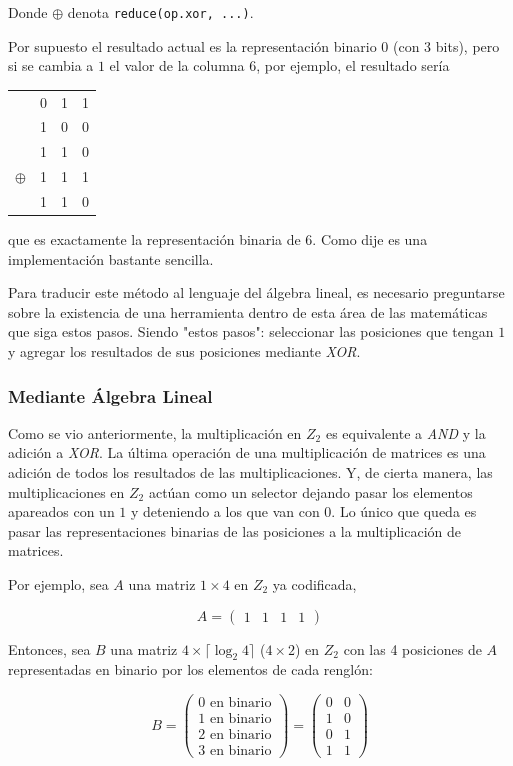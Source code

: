 \documentclass{article}
\begin{document}
Donde $\oplus$ denota \texttt{reduce(op.xor, ...)}.

Por supuesto el resultado actual es la representación binario $0$ (con 3 bits), pero si se cambia a $1$ el valor de la columna 6, por ejemplo, el resultado sería

\begin{center}
\begin{tabular}{c c c c}
    & 0 & 1 & 1 \\
    & 1 & 0 & 0 \\
    & 1 & 1 & 0 \\
    $\oplus$ & 1 & 1 & 1 \\
    \hline
    & 1 & 1 & 0
\end{tabular}
\end{center}
que es exactamente la representación binaria de 6. Como dije es una implementación bastante sencilla.

Para traducir este método al lenguaje del álgebra lineal, es necesario preguntarse sobre la existencia de una herramienta dentro de esta área de las matemáticas que siga estos pasos. Siendo "estos pasos": seleccionar las posiciones que tengan $1$ y agregar los resultados de sus posiciones mediante \textit{XOR}.

\subsubsection{Mediante Álgebra Lineal}

Como se vio anteriormente, la multiplicación en $Z_2$ es equivalente a \textit{AND} y la adición a \textit{XOR}. La última operación de una multiplicación de matrices es una adición de todos los resultados de las multiplicaciones. Y, de cierta manera, las multiplicaciones en $Z_2$ actúan como un selector dejando pasar los elementos apareados con un $1$ y deteniendo a los que van con $0$. Lo único que queda es pasar las representaciones binarias de las posiciones a la multiplicación de matrices.

Por ejemplo, sea $A$ una matriz $1 \times 4$ en $Z_2$ ya codificada,

$$
A = \begin{pmatrix}
    1 & 1 & 1 & 1
\end{pmatrix}
$$

Entonces, sea $B$ una matriz $4 \times \lceil\log_2{4}\rceil$ ($4 \times 2$) en $Z_2$ con las 4 posiciones de $A$ representadas en binario por los elementos de cada renglón:

$$
B = \begin{pmatrix}
    \text{0 en binario} \\
    \text{1 en binario} \\
    \text{2 en binario} \\
    \text{3 en binario}
\end{pmatrix}
= \begin{pmatrix}
    0 & 0 \\
    1 & 0 \\
    0 & 1 \\
    1 & 1
\end{pmatrix}
$$
\end{document}
